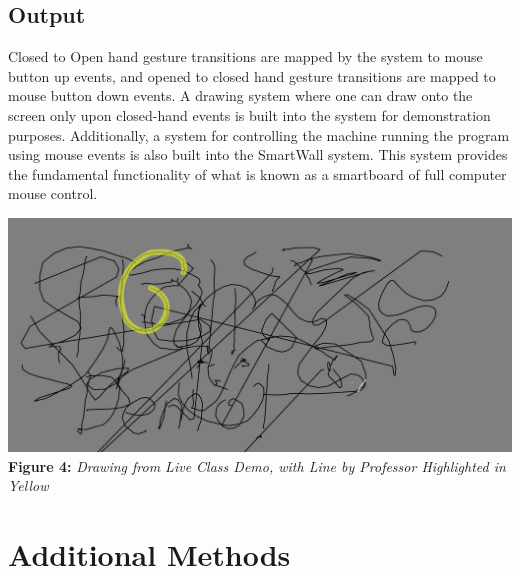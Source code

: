 \documentclass[twoside,twocolumn]{article}
\begin{document}
\subsection{Output}
Closed to Open hand gesture transitions are mapped by the system to mouse button up events, and opened to closed hand gesture transitions are mapped to mouse button down events. A drawing system where one can draw onto the screen only upon closed-hand events is built into the system for demonstration purposes. Additionally, a system for controlling the machine running the program using mouse events is also built into the SmartWall system. This system provides the fundamental functionality of what is known as a smartboard of full computer mouse control.

\begin{center}
	\includegraphics[scale=0.13]{demo_highlight} \\
	\vspace{0.25cm}
	\small{\textbf{Figure 4:} \textit{Drawing from Live Class Demo, with Line by Professor Highlighted in Yellow}}
\end{center}


\section{Additional Methods}
\end{document}
